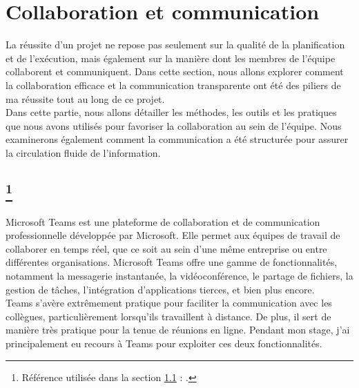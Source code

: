 \documentclass[a4paper, 12pt, french]{article}
\newcommand{\printSectionFootnote}[2]{
	\nameref{#1} \footnote{Référence utilisée dans la section \ref{#1} \nameref{#1} : \cite{#2}.}
}
\begin{document}

	
			\section{Collaboration et communication}
				La réussite d'un projet ne repose pas seulement sur la qualité de la planification et de l'exécution, mais également sur la manière dont les membres de l'équipe collaborent et communiquent. Dans cette section, nous allons explorer comment la collaboration efficace et la communication transparente ont été des piliers de ma réussite tout au long de ce projet.\\

				Dans cette partie, nous allons détailler les méthodes, les outils et les pratiques que nous avons utilisés pour favoriser la collaboration au sein de l'équipe. Nous examinerons également comment la communication a été structurée pour assurer la circulation fluide de l'information.
				\newpage
				\subsection[Teams : outil de messagerie instantanée]{\printSectionFootnote{subsubsection:teams}{wikipedia:teams}}\label{subsubsection:teams}
					Microsoft Teams est une plateforme de collaboration et de communication professionnelle développée par Microsoft. Elle permet aux équipes de travail de collaborer en temps réel, que ce soit au sein d'une même entreprise ou entre différentes organisations. Microsoft Teams offre une gamme de fonctionnalités, notamment la messagerie instantanée, la vidéoconférence, le partage de fichiers, la gestion de tâches, l'intégration d'applications tierces, et bien plus encore.\\

					Teams s'avère extrêmement pratique pour faciliter la communication avec les collègues, particulièrement lorsqu'ils travaillent à distance. De plus, il sert de manière très pratique pour la tenue de réunions en ligne. Pendant mon stage, j'ai principalement eu recours à Teams pour exploiter ces deux fonctionnalités.
					
\end{document}
